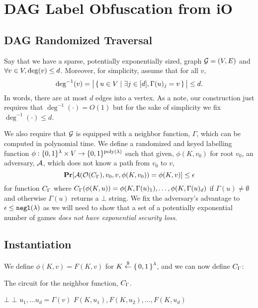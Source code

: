\newcommand{\labelFunc}{\phi}
\newcommand{\imageFn}{\text{Image}}
\newcommand{\pathSuffix}{\text{Suff}}
\newcommand{\pathSet}{\mathcal{P}}
\newcommand{\obfFN}{\mathcal{O}}
\newcommand{\circMid}{C^{\text{Mid}}}

\section{DAG Label Obfuscation from iO}
\subsection{DAG Randomized Traversal}
Say that we have a sparse, potentially exponentially sized, graph $\mathcal{G} = (V, E)$
and $\forall v \in V, \deg(v) \leq d$. Moreover, for simplicity,
assume that for all $v$, 
$$
\deg^{-1}(v) = \big|\set{u \in V \mid \exists j \in [d], \Gamma(u)_j = v}\big| \leq d.
$$
In words, there are at most $d$ edges into a vertex. As a note, our construction just requires
that $\deg^{-1}(\cdot) = O(1)$ but for the sake of simplicity we fix $\deg^{-1}(\cdot) \leq d$.

We also require that $\mathcal{G}$ is equipped with a neighbor function, $\Gamma$, which can be computed in polynomial time.
We define a randomized and keyed labelling function $\phi: \{0,1\}^\lambda \times V \rightarrow \{0,1\}^{\operatorname{poly}(\lambda)}$ 
such that given, $\phi(K, v_0)$ for root $v_0$, an adversary, $\mathcal{A}$, which does not know a path from $v_0$ to $v$,
\begin{equation}
	\label{eq:guessPhi}
	\Pr[\advers(\mathcal{O}(\circNeigb), v_0, v, \labelFunc(K, v_0)) = \labelFunc(K, v)] \leq \epsilon
\end{equation}
for function $C_\Gamma$ where $\circNeigb(\labelFunc(K, u)) = \labelFunc(K, \Gamma(u)_1), \dots, \labelFunc(K, \Gamma(u)_d)$
if $\Gamma(u) \neq \emptyset$ and otherwise $\Gamma(u)$ returns a $\bot$ string.
We fix the adversary's advantage to $\epsilon \leq \texttt{negl}(\lambda)$ as we will need to show
that a set of a potentially exponential number of games \emph{does not have exponential security loss}.

\subsection{Instantiation}
We define 
$
	\labelFunc(K, v) = F(K, v)
$ for $K \overset{\$}{\gets} \set{0, 1}^\lambda$, and we can now define $C_\Gamma$:
\begin{algorithm}[H]
	\caption{
		The circuit for the neighbor function, $C_\Gamma$.
	}
	\begin{algorithmic}[1]
				\State \Return $\bot$
			\EndIf
				\State \Return $\bot$
			\EndIf
			\State $u_1, \dots u_d = \Gamma(v)$
			\State \Return $F(K, u_1), F(K, u_2), \dots, F(K, u_d)$
		\EndFunction
	\end{algorithmic}
	\label{alg:neighb}
\end{algorithm}

